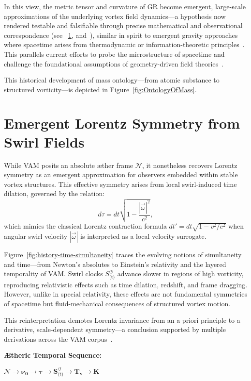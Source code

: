 In this view, the metric tensor and curvature of GR become emergent, large-scale approximations of the underlying vortex field dynamics—a hypothesis now rendered testable and falsifiable through precise mathematical and observational correspondence (see ~\ref{sec:lorentz_recovery}, and~\cite{VAM-8, VAM-3}), similar in spirit to emergent gravity approaches where spacetime arises from thermodynamic or information-theoretic principles~\cite{Verlinde2011}. This parallels current efforts to probe the microstructure of spacetime and challenge the foundational assumptions of geometry-driven field theories~\cite{hossenfelder2018lost}.

This historical development of mass ontology—from atomic substance to structured vorticity—is depicted in Figure~\ref{fig:OntologyOfMass}.




\section{Emergent Lorentz Symmetry from Swirl Fields}
\label{sec:lorentz_recovery}

While VAM posits an absolute æther frame \(\boldsymbol{\mathcal{N}}\), it nonetheless recovers Lorentz symmetry as an emergent approximation for observers embedded within stable vortex structures. This effective symmetry arises from local swirl-induced time dilation, governed by the relation:
\begin{equation}
    d\tau = dt \sqrt{1 - \frac{|\vec{\omega}|^2}{c^2}},
\end{equation}
which mimics the classical Lorentz contraction formula \(dt' = dt \sqrt{1 - v^2/c^2}\) when angular swirl velocity \(|\vec{\omega}|\) is interpreted as a local velocity surrogate.



Figure~\ref{fig:history-time-simultaneity} traces the evolving notions of simultaneity and time—from Newton’s absolutes to Einstein’s relativity and the layered temporality of VAM.
Swirl clocks \(S^{\circlearrowleft}_\text{(t)}\) advance slower in regions of high vorticity, reproducing relativistic effects such as time dilation, redshift, and frame dragging. However, unlike in special relativity, these effects are not fundamental symmetries of spacetime but fluid-mechanical consequences of structured vortex motion.

This reinterpretation demotes Lorentz invariance from an a priori principle to a derivative, scale-dependent symmetry—a conclusion supported by multiple derivations across the VAM corpus~\cite{VAM-1, VAM-2, VAM-15}.

\vspace{0.8em}

\noindent\textbf{Ætheric Temporal Sequence:}
\begin{center}
\(\boldsymbol{\mathcal{N}} \to \boldsymbol{\nu_0} \to \boldsymbol{\tau} \to \boldsymbol{S}^{\boldsymbol{\circlearrowleft}}_\text{(t)} \to \boldsymbol{T_v} \to \mathbb{\boldsymbol{K}}\)
\end{center}